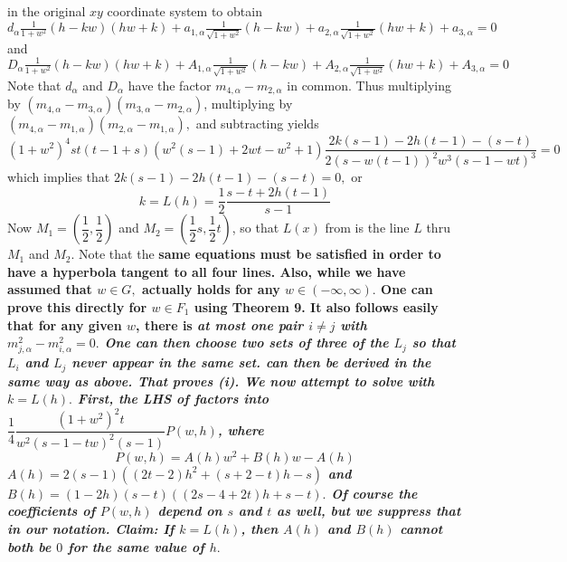  in the original $xy$ coordinate system to obtain $$d_{\alpha }\allowbreak \tfrac{1}{1+w^{2}}(h-kw)(hw+k)+a_{1,\alpha }\tfrac{1}{\sqrt{1+w^{2}}}(h-kw)+a_{2,\alpha }\tfrac{1}{\sqrt{1+w^{2}}}(hw+k)+\allowbreak a_{3,\alpha }=0\tag{30}$$ and $$D_{\alpha }\allowbreak \tfrac{1}{1+w^{2}}(h-kw)(hw+k)+A_{1,\alpha }\tfrac{1}{\sqrt{1+w^{2}}}(h-kw)+A_{2,\alpha }\tfrac{1}{\sqrt{1+w^{2}}}(hw+k)+\allowbreak A_{3,\alpha }=0\tag{31}$$ Note that $d_{\alpha }$ and $D_{\alpha }$ have the factor $m_{4,\alpha }-m_{2,\alpha }$ in common. Thus multiplying  by $\left( m_{4,\alpha }-m_{3,\alpha }\right) \left( m_{3,\alpha }-m_{2,\alpha }\right) $, multiplying  by $\left( m_{4,\alpha }-m_{1,\alpha }\right) \left( m_{2,\alpha }-m_{1,\alpha }\right) ,$ and subtracting yields 
$$\left( 1+w^{2}\right) ^{4}st(t-1+s)(w^{2}(s-1)+2wt-w^{2}+1) \frac{2k(s-1)-2h(t-1)-(s-t)}{2(s-w(t-1))^{2}w^{3}(s-1-wt) ^{3}}=0$$ which implies that $2k(s-1)-2h(t-1)-(s-t)=0,$ or $$k=L(h)\allowbreak =\frac{1}{2}\dfrac{s-t+2h(t-1)}{s-1}\tag{32}$$ Now $M_{1}=\left( \dfrac{1}{2},\dfrac{1}{2}\right) $ and $M_{2}=\left( \dfrac{1}{2}s,\dfrac{1}{2}t\right) $, so that $L(x)$ from  is the line $L$ thru $M_{1}$ and $M_{2}.$ Note that the \bf same equations \rm must be satisfied in order to have a \bf hyperbola \rm  tangent to all four lines. Also, while we have assumed that $w\in G,$  actually holds for any $w\in (-\infty ,\infty ).$ One can prove this directly for $w\in F_{1}$ using Theorem 9. It also follows easily that for any given $w$, there is \it at most one pair \rm $i\neq j$ with $m_{j,\alpha }^{2}-m_{i,\alpha }^{2}=0.$ One can then choose two sets of three of the $L_{j}$ so that $L_{i}$ and $L_{j}$ never appear in the same set.   can then be derived in the same way as above. That proves (i). We now attempt to solve   with $k=L(h).$ First, the LHS of  factors into $\dfrac{1}{4}\dfrac{\left( 1+w^{2}\right) ^{2}t}{w^{2}\left( s-1-tw\right) ^{2}(s-1)}P(w,h)$, where $$P(w,h)=A(h)w^{2}+B(h)w-A(h)$$ $A(h)=2\left( s-1\right) \left( \left( 2t-2\right) h^{2}+\left( s+2-t\right) h-s\right) $ and \newline $B(h)=\left( 1-2h\right) \left( s-t\right) \left( \left( 2s-4+2t\right) h+s-t\right) .$ Of course the coefficients of \newline $P(w,h)$ depend on $s$ and $t$ as well, but we suppress that in our notation. \nl 	
\bf Claim: \rm If $k=L(h)$, then $A(h)$ and $B(h)$ cannot both be $0$ for the same value of $h.$ \nl 	
